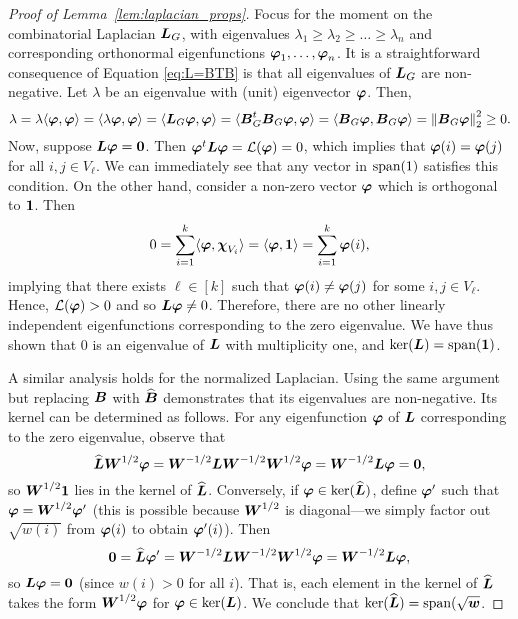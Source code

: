 \begin{proof}[Proof of Lemma~\ref{lem:laplacian_props}]
	Focus for the moment on the combinatorial Laplacian  $\vb*{L}_G$, with eigenvalues $\lambda_1\geq \lambda_2\geq \dots \geq \lambda_n$ and corresponding orthonormal eigenfunctions $\vb*{\varphi}_1,\dots,\vb*{\varphi}_n$. It is a straightforward consequence of Equation \eqref{eq:L=BTB} is that all eigenvalues of $\vb*{L}_G$ are non-negative. Let $\lambda$ be an eigenvalue with (unit) eigenvector $\vb*{\varphi}$. Then,  
	\begin{equation*}
	\lambda = \lambda\langle \vb*{\varphi},\vb*{\varphi}\rangle = \langle \lambda \vb*{\varphi},\vb*{\varphi}\rangle = \langle \vb*{L}_G\vb*{\varphi},\vb*{\varphi}\rangle = \langle \vb*{B}_G^t \vb*{B}_G\vb*{\varphi},\vb*{\varphi}\rangle = \langle \vb*{B}_G\vb*{\varphi},\vb*{B}_G\vb*{\varphi}\rangle =\norm{\vb*{B}_G\vb*{\varphi}}_2^2 \geq 0.
	\end{equation*}
	Now, suppose $\vb*{L}\vb*{\varphi}=\vb{0}$. Then $\vb*{\varphi}^t\vb*{L}\vb*{\varphi}=\mathcal{L}(\vb*{\varphi})=0$, which implies that $\vb*{\varphi}(i)=\vb*{\varphi}(j)$ for all $i,j\in V_\ell$. We can immediately see that any vector in $\textnormal{span}(1)$ satisfies this condition. 
	On the other hand, consider a non-zero vector $\vb*{\varphi}$ which is orthogonal to $\vb{1}$. Then 
	\[0=\sum_{i=1}^k \langle \vb*{\varphi},\boldsymbol{\chi}_{V_i}\rangle = \langle \vb*{\varphi},\vb{1} \rangle=\sum_{i=1}^k \vb*{\varphi}(i),\]
	implying that there exists $\ell\in[k]$ such that $\vb*{\varphi}(i)\neq\vb*{\varphi}(j)$ for some $i,j\in V_\ell$. Hence, $\mathcal{L}(\vb*{\varphi})>0$ and so $\vb*{L}\vb*{\varphi}\neq 0$. Therefore, there are no other linearly independent eigenfunctions corresponding to the zero eigenvalue.  
	We have thus shown that 0 is an eigenvalue of $\vb*{L}$ with multiplicity one, and $\ker(\vb*{L})=\textnormal{span}(\vb{1})$. 
	
	A similar analysis holds for the normalized Laplacian. Using the same argument but replacing $\vb*{B}$ with $\widehat{\vb*{B}}$ demonstrates that its eigenvalues are non-negative. Its kernel can be determined as follows. For any eigenfunction $\vb*{\varphi}$ of $\vb*{L}$ corresponding to the zero eigenvalue, observe that 
	\[\widehat{\vb*{L}}\vb*{W}^{1/2}\vb*{\varphi} = \vb*{W}^{-1/2}\vb*{L}\vb*{W}^{-1/2}\vb*{W}^{1/2}\vb*{\varphi} = \vb*{W}^{-1/2}\vb*{L}\vb*{\varphi} = \vb{0},\]
	so $\vb*{W}^{1/2}\vb{1}$ lies in the kernel of $\widehat{\vb*{L}}$.
	Conversely, if $\vb*{\varphi}\in\ker(\widehat{\vb*{L}})$, define $\vb*{\varphi}'$ such that $\vb*{\varphi}=\vb*{W}^{1/2}\vb*{\varphi}'$ (this is possible because $\vb*{W}^{1/2}$ is diagonal---we simply factor out $\sqrt{w(i)}$ from $\vb*{\varphi}(i)$ to obtain $\vb*{\varphi}'(i)$). Then 
	\[\vb{0} =\widehat{\vb*{L}}\vb*{\varphi}' = \vb*{W}^{-1/2}\vb*{L} \vb*{W}^{-1/2}\vb*{W}^{1/2}\vb*{\varphi} = \vb*{W}^{-1/2}\vb*{L}\vb*{\varphi},\]
	so $\vb*{L}\vb*{\varphi}=\vb{0}$ (since $w(i)>0$ for all $i$). That is, each element in the kernel of $\widehat{\vb*{L}}$ takes the form $\vb*{W}^{1/2}\vb*{\varphi}$ for $\vb*{\varphi}\in\ker(\vb*{L})$. We conclude that $\ker(\widehat{\vb*{L}})=\textnormal{span}(\sqrt{\vb*{w}}$. 
\end{proof}

